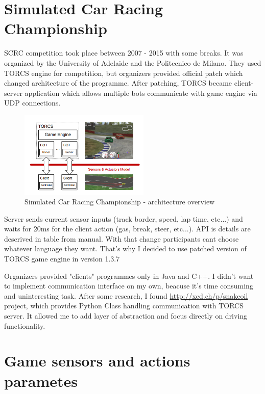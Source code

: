 \documentclass[declaration,shortabstract,english,inz]{iithesis}
\begin{document}
\section{Simulated Car Racing Championship}

SCRC competition took place between 2007 - 2015 with some breaks. It was organized by the University of Adelaide and the Politecnico de Milano. They used TORCS engine for competition, but organizers provided official patch which changed architecture of the programme. After patching, TORCS became client-server application which allows multiple bots communicate with game engine via UDP connections. 

\begin{figure}
    \includegraphics[width=0.55\textwidth]{img/scr_architecture.png}
    \caption{Simulated Car Racing Championship - architecture overview \cite{scrc_manual}}
    \label{fig:scrc_arc}
\end{figure}

Server sends current sensor inputs (track border, speed, lap time, etc...) and waits for 20ms for the client action (gas, break, steer, etc...). API is details are descrived in table from manual. With that change participants cant choose whatever language they want. That's why I decided to use patched version of TORCS game engine in version 1.3.7

Organizers provided "clients" programmes only in Java and C++. I didn't want to implement communication interface on my own, beacuse it's time consuming  and uninteresting task. After some research,  I found \url{http://xed.ch/p/snakeoil} project, which provides Python Class handling communication with TORCS server. It allowed me to add layer of abstraction and focus directly on driving functionality.

\section{Game sensors and actions parametes}
    
\end{document}
